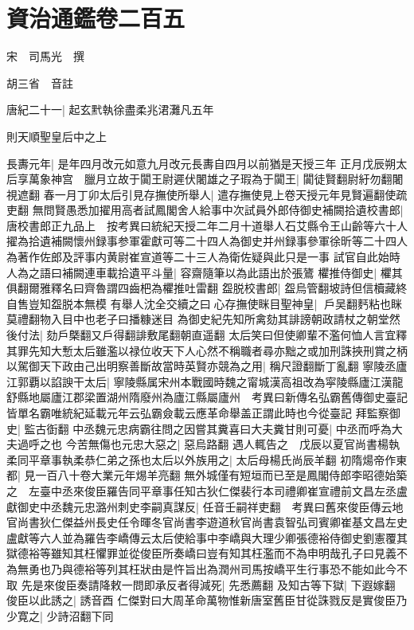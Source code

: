 \chapter{資治通鑑卷二百五}
宋　司馬光　撰

胡三省　音註

唐紀二十一|{
	起玄黓執徐盡柔兆涒灘凡五年}


則天順聖皇后中之上

長夀元年|{
	是年四月改元如意九月改元長夀自四月以前猶是天授三年}
正月戊辰朔太后享萬象神宫　臘月立故于闐王尉遲伏闍雄之子瑕為于闐王|{
	闐徒賢翻尉紆勿翻闍視遮翻}
春一月丁卯太后引見存撫使所舉人|{
	遣存撫使見上卷天授元年見賢遍翻使疏吏翻}
無問賢愚悉加擢用高者試鳳閣舍人給事中次試員外郎侍御史補闕拾遺校書郎|{
	唐校書郎正九品上　按考異曰統紀天授二年二月十道舉人石艾縣令王山齡等六十人擢為拾遺補闕懷州録事参軍霍獻可等二十四人為御史并州録事參軍徐昕等二十四人為著作佐郎及評事内黄尉崔宣道等二十三人為衛佐疑與此只是一事}
試官自此始時人為之語曰補闕連車載拾遺平斗量|{
	容齋隨筆以為此語出於張鷟}
欋推侍御史|{
	欋其俱翻爾雅釋名曰齊魯謂四齒杷為欋推吐雷翻}
盌脱校書郎|{
	盌烏管翻坡詩但信櫝藏終自售豈知盌脱本無模}
有舉人沈全交續之曰心存撫使眯目聖神皇|{
	戶吴翻麫粘也眯莫禮翻物入目中也老子曰播糠迷目}
為御史紀先知所禽劾其誹謗朝政請杖之朝堂然後付法|{
	劾戶槩翻又戶得翻誹敷尾翻朝直遥翻}
太后笑曰但使卿輩不濫何恤人言宜釋其罪先知大慙太后雖濫以禄位收天下人心然不稱職者尋亦黜之或加刑誅挾刑賞之柄以駕御天下政由己出明察善斷故當時英賢亦競為之用|{
	稱尺證翻斷丁亂翻}
寧陵丞廬江郭覇以諂諛干太后|{
	寧陵縣属宋州本戰國時魏之甯城漢高祖改為寜陵縣廬江漢龍舒縣地屬廬江郡梁置湖州隋廢州為廬江縣屬廬州　考異曰新傳名弘霸舊傳御史臺記皆單名霸唯統紀延載元年云弘霸僉載云應革命舉盖正謂此時也今從臺記}
拜監察御史|{
	監古衘翻}
中丞魏元忠病霸往問之因嘗其糞喜曰大夫糞甘則可憂|{
	中丞而呼為大夫過呼之也}
今苦無傷也元忠大惡之|{
	惡烏路翻}
遇人輒告之　戊辰以夏官尚書楊執柔同平章事執柔恭仁弟之孫也太后以外族用之|{
	太后母楊氏尚辰羊翻}
初隋煬帝作東都|{
	見一百八十卷大業元年焬羊亮翻}
無外城僅有短垣而已至是鳳閣侍郎李昭德始築之　左臺中丞來俊臣羅告同平章事任知古狄仁傑裴行本司禮卿崔宣禮前文昌左丞盧獻御史中丞魏元忠潞州刺史李嗣真謀反|{
	任音壬嗣祥吏翻　考異曰舊來俊臣傳云地官尚書狄仁傑益州長史任令暉冬官尚書李遊道秋官尚書袁智弘司賓卿崔基文昌左史盧獻等六人並為羅告李嶠傳云太后使給事中李嶠與大理少卿張德裕侍御史劉憲覆其獄德裕等雖知其枉懼罪並從俊臣所奏嶠曰豈有知其枉濫而不為申明哉孔子曰見義不為無勇也乃與德裕等列其枉狀由是忤旨出為潤州司馬按嶠平生行事恐不能如此今不取}
先是來俊臣奏請降敕一問即承反者得減死|{
	先悉薦翻}
及知古等下獄|{
	下遐嫁翻}
俊臣以此誘之|{
	誘音酉}
仁傑對曰大周革命萬物惟新唐室舊臣甘從誅戮反是實俊臣乃少寛之|{
	少詩沼翻下同}
